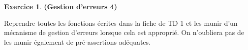 \documentclass[12pt]{article}
\theoremstyle{definition}
\newtheorem{Exercice}{Exercice}
\begin{document}
\begin{Exercice} {\bf (Gestion d'erreurs 4)}\smallskip

Reprendre toutes les fonctions écrites dans la fiche de TD 1 et les 
munir d'un mécanisme de gestion d'erreurs lorsque cela est approprié.
On n'oubliera pas de les munir également de pré-assertions adéquates.
\end{Exercice}
\bigskip
\end{document}
